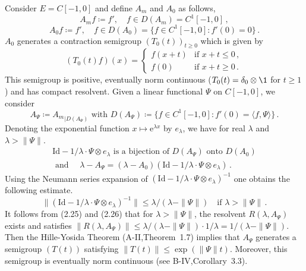 \begin{example}
\begin{enumerate}[(i), wide]
	Consider $E = C[-1,0]$ and define $A_{m}$ and $A_{0}$ as follows,
	\begin{equation}\label{eq:b3-2.23}
		A_{m}f \coloneqq f', \quad f \in D(A_{m}) = C^{1}[-1,0]\,,
	\end{equation}
	\begin{equation}\label{eq:b3-2.24}
		A_{0}f \coloneqq f', \quad f \in D(A_{0}) = \{f \in C^{1}[-1,0] \colon f'(0) = 0\}\,.
	\end{equation}
	$A_{0}$ generates a contraction semigroup $(T_{0}(t))_{t \geq 0}$ which is given by
	\begin{equation}\label{eq:b3-2.25}
		(T_{0}(t)f)(x) = \begin{cases}
			f(x+t) & \text{if } x+t \leq 0\,, \\
			f(0) & \text{if } x+t \geq 0\,.
		\end{cases}
	\end{equation}
	This semigroup is positive, eventually norm continuous ($T_{0}(t) = \delta_{0}\otimes \1$ for $t \geq 1$) and has compact resolvent.
	Given a linear functional $\Psi$ on $C[-1,0]$, we consider
	\begin{equation}\label{eq:b3-2.26}
		A_{\Psi} \coloneqq {A_{m}}_{|D(A_{\Psi})} \text{ with } D(A_{\Psi}) \coloneqq \{f \in C^{1}[-1,0] \colon f'(0) = \langle f,\Psi \rangle\}\,.
	\end{equation}
	Denoting the exponential function $x \mapsto \mathrm{e}^{\lambda x}$ by $e_{\lambda}$, we have for real $\lambda$ and $\lambda > \|\Psi\|$.
	 \begin{equation}\label{eq:b3-2.27}
	 \begin{aligned}
		\text{Id} - 1/\lambda \cdot \Psi \otimes e_{\lambda} \text{ is a bijection of } D(A_{\Psi}) \text{ onto } D(A_{0})   \\
		\text{ and }\quad \lambda - A_{\Psi} = (\lambda - A_{0})(\text{Id} - 1/\lambda \cdot \Psi \otimes e_{\lambda})\,.
	\end{aligned}
	\end{equation}
	Using the Neumann series expansion of $(\text{Id} - 1/\lambda \cdot \Psi \otimes e_{\lambda})^{-1}$ one obtains the following estimate.
	\begin{equation}\label{eq:b3-2.28}
		\|(\text{Id} - 1/\lambda \cdot \Psi \otimes e_{\lambda})^{-1}\| \leq \lambda/(\lambda - \|\Psi\|) \quad \text{if } \lambda > \|\Psi\|\,.
	\end{equation}
%
%	
It follows from (2.25) and (2.26) that for $\lambda > \|\Psi\|$, the resolvent $R(\lambda,A_{\Psi})$ exists and satisfies $\|R(\lambda,A_{\Psi})\| \leq \lambda/(\lambda-\|\Psi\|)\cdot 1/\lambda = 1/(\lambda-\|\Psi\|)$.
Then the Hille-Yosida Theorem (A-II,Theorem~1.7) implies that $A_{\Psi}$ generates a semigroup $(T(t))$ satisfying $\|T(t)\| \leq \exp(\|\Psi\|t)$.
Moreover, this semigroup is eventually norm continuous (see B-IV,Corollary~3.3).


\end{enumerate}
\end{example}
